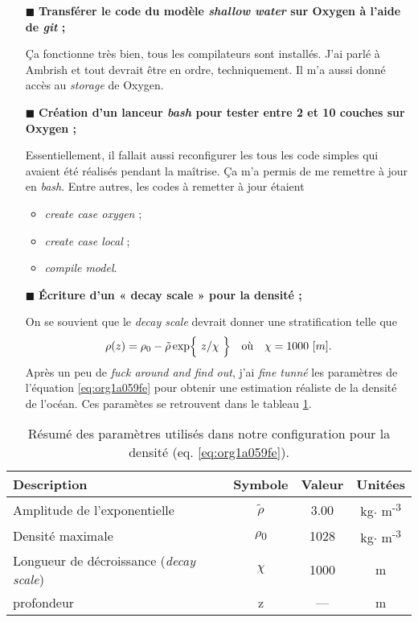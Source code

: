 \documentclass[10pt]{article}
\numberwithin{equation}{section}
\renewcommand{\boxtimes}{\blacksquare}
\newcommand{\tall}{\vphantom{pA^{x^x}_p}}
\begin{document}
\begin{itemize}
\item[{$\boxtimes$}] \textbf{Transférer le code du modèle \emph{shallow water} sur Oxygen à l'aide de \emph{git} ;}

Ça fonctionne très bien, tous les compilateurs sont installés.
J'ai parlé à Ambrish et tout devrait être en ordre, techniquement.
Il m'a aussi donné accès au \emph{storage} de Oxygen.\bigskip

\item[{$\boxtimes$}] \textbf{Création d'un lanceur \emph{bash} pour tester entre 2 et 10 couches sur Oxygen ;}

Essentiellement, il fallait aussi reconfigurer les tous les code simples qui avaient été réalisés pendant la maîtrise.
Ça m'a permis de me remettre à jour en \emph{bash}.
Entre autres, les codes à remetter à jour étaient
\begin{itemize}
\item \emph{create case oxygen} ;
\item \emph{create case local} ;
\item \emph{compile model}.\bigskip
\end{itemize}

\item[{$\boxtimes$}] \textbf{Écriture d'un « decay scale » pour la densité ;}

On se souvient que le \emph{decay scale} devrait donner une stratification telle que
\begin{align}
\label{eq:org1a059fe}
  && \rho(z) = \rho_0 - \tilde{\rho}\exp{\ z/\chi\tall\ } && \text{où} && \chi = 1000\ [m]. &&
\end{align}
Après un peu de \emph{fuck around and find out}, j'ai \emph{fine tunné} les paramètres de l'équation \ref{eq:org1a059fe} pour obtenir une estimation réaliste de la densité de l'océan.
Ces paramètes se retrouvent dans le tableau \ref{tab:orge472e58}.\bigskip
\end{itemize}

\begin{table}[htbp]
\caption{\label{tab:orge472e58}Résumé des paramètres utilisés dans notre configuration pour la densité (eq. \ref{eq:org1a059fe}).}
\centering
\begin{tabular}{lccc}
\hline
\hline
Description & Symbole & Valeur & Unitées\\
\hline
Amplitude de l'exponentielle & \(\tilde{\rho}\) & 3.00 & kg\(\cdot\) m\textsuperscript{-3}\\
Densité maximale & \(\rho\)\textsubscript{0} & 1028 & kg\(\cdot\) m\textsuperscript{-3}\\
Longueur de décroissance (\emph{decay scale}) & \(\chi\) & 1000 & m\\
profondeur & z & --- & m\\
\hline
\end{tabular}
\end{table}
\end{document}
